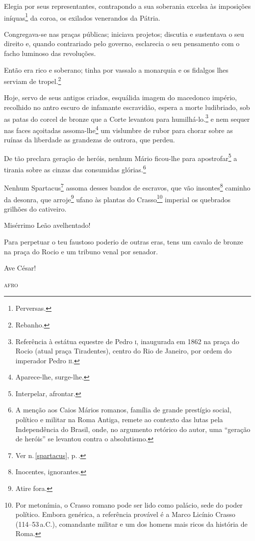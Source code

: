 Elegia por seus representantes, contrapondo a sua soberania excelsa às
imposições iníquas\footnote{Perversas.} da coroa, os exilados
venerandos da Pátria.

Congregava-se nas praças públicas; iniciava projetos; discutia e
sustentava o seu direito e, quando contrariado pelo governo, esclarecia
o seu pensamento com o facho luminoso das revoluções.

Então era rico e soberano; tinha por vassalo a monarquia e os fidalgos
lhes serviam de tropel.\footnote{Rebanho.}

Hoje, servo de seus antigos criados, esquálida imagem do macedonco
império, recolhido no antro escuro de infamante escravidão, espera a
morte ludibriado, sob as patas do corcel de bronze que a Corte levantou
para humilhá-lo.\footnote{Referência à estátua equestre de Pedro \textsc{i},
  inaugurada em 1862 na praça do Rocio (atual praça Tiradentes), centro
  do Rio de Janeiro, por ordem do imperador Pedro \textsc{ii}.} e nem sequer nas
faces açoitadas assoma-lhe\footnote{Aparece-lhe, surge-lhe.} um
vislumbre de rubor para chorar sobre as ruínas da liberdade as grandezas
de outrora, que perdeu.

De tão preclara geração de heróis, nenhum Mário ficou-lhe para
apostrofar\footnote{Interpelar, afrontar.} a tirania sobre as cinzas
das consumidas glórias.\footnote{A menção aos Caios Mários romanos,
  família de grande prestígio social, político e militar na Roma Antiga,
  remete ao contexto das lutas pela Independência do Brasil, onde, no
  argumento retórico do autor, uma ``geração de heróis'' se levantou
  contra o absolutismo.}

Nenhum Spartacus\footnote{Ver n.\,\ref{spartacus}, p.\,\pageref{spartacus}.} assoma desses bandos de escravos, que vão
insontes\footnote{Inocentes, ignorantes.} caminho da desonra, que
arroje\footnote{Atire fora.} ufano às plantas do Crasso\footnote{Por
  metonímia, o Crasso romano pode ser lido como palácio, sede do poder
  político. Embora genérica, a referência provável é a Marco Licínio
  Crasso (114--53\,a.C.), comandante militar e um dos homens mais ricos da
  história de Roma.} imperial os quebrados grilhões do cativeiro.

Misérrimo Leão avelhentado!

Para perpetuar o teu faustoso poderio de outras eras, tens um cavalo de
bronze na praça do Rocio e um tribuno venal por senador.

Ave César!

\begin{flushright}
\textsc{afro}
\end{flushright}

